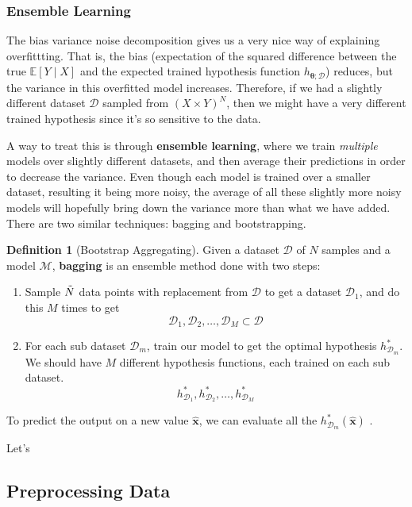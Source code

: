 \documentclass{article}
\theoremstyle{definition}
\newtheorem{definition}{Definition}[section]
\begin{document}
    \subsubsection{Ensemble Learning}

    The bias variance noise decomposition gives us a very nice way of explaining overfittting. That is, the bias (expectation of the squared difference between the true $\mathbb{E}[Y \mid X]$ and the expected trained hypothesis function $h_{\boldsymbol{\theta}; \mathcal{D}}$) reduces, but the variance in this overfitted model increases. Therefore, if we had a slightly different dataset $\mathcal{D}$ sampled from $(X \times Y)^N$, then we might have a very different trained hypothesis since it's so sensitive to the data. 

    A way to treat this is through \textbf{ensemble learning}, where we train \textit{multiple} models over slightly different datasets, and then average their predictions in order to decrease the variance. Even though each model is trained over a smaller dataset, resulting it being more noisy, the average of all these slightly more noisy models will hopefully bring down the variance more than what we have added. There are two similar techniques: bagging and bootstrapping. 

    \begin{definition}[Bootstrap Aggregating]
    Given a dataset $\mathcal{D}$ of $N$ samples and a model $\mathcal{M}$, \textbf{bagging} is an ensemble method done with two steps: 
    \begin{enumerate}
        \item Sample $\Tilde{N}$ data points with replacement from $\mathcal{D}$ to get a dataset $\mathcal{D}_1$, and do this $M$ times to get 
        \[\mathcal{D}_1, \mathcal{D}_2, \ldots, \mathcal{D}_M \subset \mathcal{D}\]
        \item For each sub dataset $\mathcal{D}_m$, train our model to get the optimal hypothesis $h_{\mathcal{D}_m}^\ast$. We should have $M$ different hypothesis functions, each trained on each sub dataset. 
        \[h_{\mathcal{D}_1}^\ast, h_{\mathcal{D}_2}^\ast, \ldots, h_{\mathcal{D}_M}^\ast\]
    \end{enumerate}
    To predict the output on a new value $\hat{\mathbf{x}}$, we can evaluate all the $h_{\mathcal{D}_m}^\ast (\hat{\mathbf{x}})$ .
    \end{definition}

    Let's

  \subsection{Preprocessing Data}
\end{document}
